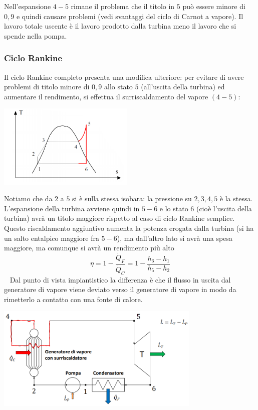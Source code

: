 \newline
Nell'espansione $4-5$ rimane il problema che il titolo in $5$ può essere minore di $0,9$ e quindi causare problemi (vedi svantaggi del ciclo di Carnot a vapore).\newline
\newline
Il lavoro totale uscente è il lavoro prodotto dalla turbina meno il lavoro che si spende nella pompa.
\subsubsection{Ciclo Rankine}
Il ciclo Rankine completo presenta una modifica ulteriore: per evitare di avere problemi di titolo minore di $0,9$ allo stato $5$ (all'uscita della turbina) ed aumentare il rendimento, si effettua il surriscaldamento del vapore $(4-5)$:
\begin{center}
    \includegraphics[height=4cm]{../L08/img7.PNG}
\end{center}
Notiamo che da $2$ a $5$ si è sulla stessa isobara: la pressione su $2,3,4,5$ è la stessa.\newline
\newline
L'espansione della turbina avviene quindi in $5-6$ e lo stato $6$ (cioè l'uscita della turbina) avrà un titolo maggiore rispetto al caso di ciclo Rankine semplice.\newline
\newline
Questo riscaldamento aggiuntivo aumenta la potenza erogata dalla turbina (si ha un salto entalpico maggiore fra $5-6$), ma dall'altro lato si avrà una spesa maggiore, ma comunque si avrà un rendimento più alto
\[
    \eta = 1- \frac{\dot{Q}_F}{\dot{Q}_C} = 1- \frac{h_6-h_1}{h_5-h_2}
\]
\ \newline
Dal punto di vista impiantistico la differenza è che il flusso in uscita dal generatore di vapore viene deviato verso il generatore di vapore in modo da rimetterlo a contatto con una fonte di calore.
\begin{center}
    \includegraphics[height=5cm]{../L08/img8.PNG}
\end{center}